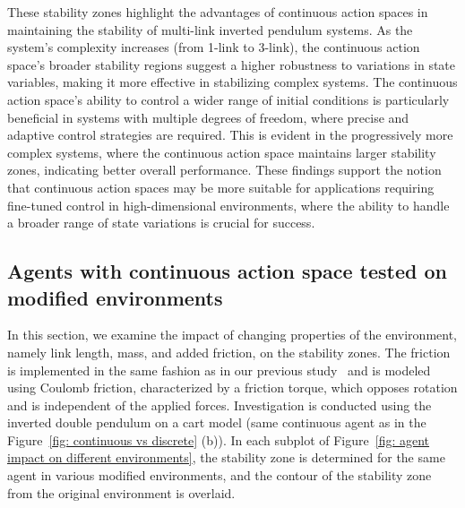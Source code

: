 These stability zones highlight the advantages of continuous action spaces in maintaining the stability of multi-link inverted pendulum systems. As the system's complexity increases (from 1-link to 3-link), the continuous action space's broader stability regions suggest a higher robustness to variations in state variables, making it more effective in stabilizing complex systems. The continuous action space's ability to control a wider range of initial conditions is particularly beneficial in systems with multiple degrees of freedom, where precise and adaptive control strategies are required. This is evident in the progressively more complex systems, where the continuous action space maintains larger stability zones, indicating better overall performance. These findings support the notion that continuous action spaces may be more suitable for applications requiring fine-tuned control in high-dimensional environments, where the ability to handle a broader range of state variations is crucial for success.

\subsection{Agents with continuous action space tested on modified environments} \label{subsec: Agent tested on modified environments}

In this section, we examine the impact of changing properties of the environment, namely
link length, mass, and added friction, on the stability zones. The friction is implemented in the same fashion as in our previous study~\cite{manzl2023relrl} and is modeled using Coulomb friction, characterized by a friction torque, which opposes rotation and is independent of the applied forces. Investigation is conducted using the inverted double pendulum on a cart model (same continuous agent as in the Figure~\ref{fig: continuous vs discrete} (b)). In each subplot of Figure~\ref{fig: agent impact on different environments}, the stability zone is determined for the same agent in various modified environments, and the contour of the stability zone from the original environment is overlaid.

